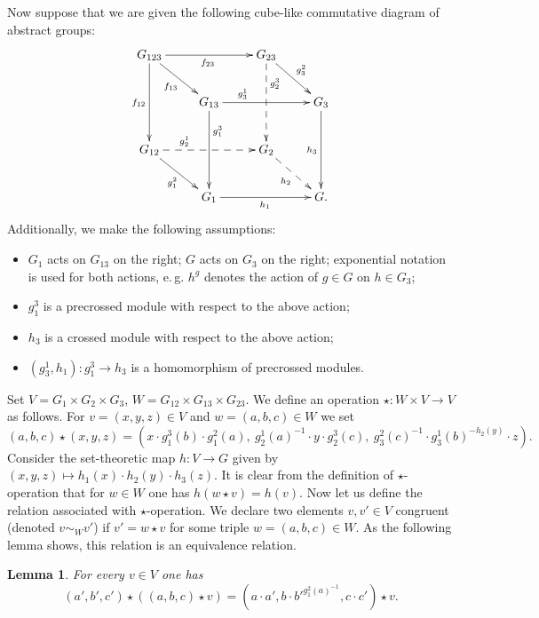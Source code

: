 \documentclass[oneside, 10pt]{amsart}
\numberwithin{equation}{section}
\numberwithin{thm}{section}
\newtheorem{lemma}[thm]{Lemma}
\numberwithin{lemma}{section}
\theoremstyle{definition}
\theoremstyle{remark}
\begin{document}
Now suppose that we are given the following cube-like commutative diagram of abstract groups:
\begin{equation} \label{eq:cube} \begin{split} \xymatrix{
G_{123} \ar[rr]_{f_{23}} \ar[dd]_{f_{12}} \ar[rd]_{f_{13}} &                        & G_{23} \ar@{-->}[dd]^(.3){g_2^3} \ar[rd]^{g^2_3} &           \\
& G_{13} \ar[rr]^(.3){g^1_3} \ar^(.3){g^3_1}[dd] &                   & G_3 \ar[dd]_{h_3} \\
G_{12} \ar@{-->}[rr]^(.3){g_2^1} \ar[rd]_{g_1^2}          &                        & G_2 \ar@{-->}[rd]_{h_2}         &           \\
& G_1 \ar[rr]_{h_1}              &                   & G.} \end{split} \end{equation}
Additionally, we make the following assumptions:
\begin{itemize}
\item $G_1$ acts on $G_{13}$ on the right; $G$ acts on $G_3$ on the right;
exponential notation is used for both actions, e.\,g. $h^g$ denotes the action of $g \in G$ on $h \in G_{3}$;
\item $g_1^3$ is a precrossed module with respect to the above action;
\item $h_3$ is a crossed module with respect to the above action;
\item $(g_3^1, h_1) \colon g_1^3 \to h_3$ is a homomorphism of precrossed modules.
\end{itemize}
Set $V = G_1 \times G_2 \times G_3$, $W = G_{12} \times G_{13} \times G_{23}$.
We define an operation $\star \colon W \times V \to V$ as follows.
For $v = (x, y, z) \in V$ and $w = (a, b, c) \in W$ we set
\[(a, b, c) \star (x, y, z) = (x \cdot g_1^3(b) \cdot g_1^2(a),\ g_2^1(a)^{-1} \cdot y \cdot g_2^3(c),\ g_3^2(c)^{-1} \cdot g_3^1(b)^{-h_2(y)} \cdot z).\]
Consider the set-theoretic map $h \colon V \to G$ given by $(x, y, z) \mapsto h_1(x) \cdot h_2(y) \cdot h_3(z)$.
It is clear from the definition of $\star$-operation that for $w \in W$ one has $h(w \star v) = h(v).$
Now let us define the relation associated with $\star$-operation.
We declare two elements $v, v' \in V$ congruent (denoted $v \sim_W v'$) if $v' = w \star v$ for some triple $w=(a, b, c) \in W$.
As the following lemma shows, this relation is an equivalence relation.
\begin{lemma} For every $v \in V$ one has
\begin{equation*}(a', b', c') \star \left( (a, b, c) \star v \right) = (a \cdot a', b \cdot {b'}^{g_1^2(a)^{-1}}, c \cdot c') \star v.\end{equation*}
\end{lemma}
\end{document}
